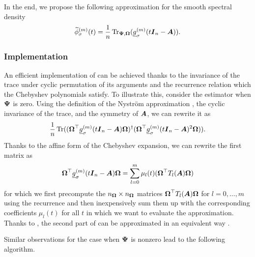 \documentclass[12pt]{article}
\begin{document}
In the end, we propose the following approximation for the smooth spectral density
\begin{equation}
    \widetilde{\phi}_{\sigma}^{(m)}(t) = \frac{1}{n} \operatorname{Tr}_{\boldsymbol{\Psi}, \boldsymbol{\Omega}}(\underline{g}_{\sigma}^{(m)}(t \boldsymbol{I}_n - \boldsymbol{A})).
    \label{equ:chebyshev-nystrom-formula}
\end{equation}

\subsubsection{Implementation}
\label{subsubsec:chebyshev-nystrom-implementation}

An efficient implementation of  can be achieved thanks to the invariance of the trace under cyclic permutation of its arguments and the recurrence relation  which the Chebyshev polynomials satisfy. To illustrate this, consider the estimator  when $\boldsymbol{\Psi}$ is zero. Using the definition of the Nyström approximation , the cyclic invariance of the trace, and the symmetry of $\boldsymbol{A}$, we can rewrite it as
\begin{equation}
    \frac{1}{n} \operatorname{Tr}((\boldsymbol{\Omega}^{\top} \underline{g}^{(m)}_{\sigma}(t \boldsymbol{I}_n - \boldsymbol{A}) \boldsymbol{\Omega})^{\dagger} (\boldsymbol{\Omega}^{\top} \underline{g}^{(m)}_{\sigma}(t \boldsymbol{I}_n - \boldsymbol{A})^2 \boldsymbol{\Omega})).
    \label{equ:cyclic-property}
\end{equation}
Thanks to the affine form of the Chebyshev expansion, we can rewrite the first matrix as
\begin{equation}
    \boldsymbol{\Omega}^{\top} \underline{g}^{(m)}_{\sigma}(t \boldsymbol{I}_n - \boldsymbol{A}) \boldsymbol{\Omega} = \sum_{l=0}^{m} \mu_l(t) (\boldsymbol{\Omega}^{\top} T_l(\boldsymbol{A}) \boldsymbol{\Omega})
\end{equation}
for which we first precompute the $n_{\boldsymbol{\Omega}} \times n_{\boldsymbol{\Omega}}$ matrices $\boldsymbol{\Omega}^{\top} T_l(\boldsymbol{A}) \boldsymbol{\Omega}$ for $l=0, \dots, m$ using the recurrence  and then inexpensively sum them up with the corresponding coefficients $\mu_l(t)$ for all $t$ in which we want to evaluate the approximation. Thanks to , the second part of  can be approximated in an equivalent way .

Similar observations for the case when $\boldsymbol{\Psi}$ is nonzero lead to the following algorithm.
\end{document}
